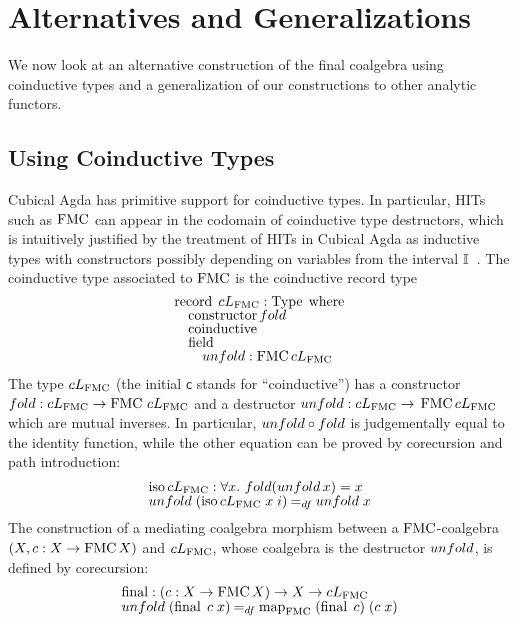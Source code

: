 \documentclass[a4paper,USenglish,cleveref]{lipics-v2021}
\begin{document}
\section{Alternatives and Generalizations}

We now look at an alternative construction of the final coalgebra using coinductive types and a generalization of our constructions to other analytic functors.

\subsection{Using Coinductive Types}\label{sec:coinductive}


Cubical Agda has primitive support for coinductive types. In particular, HITs such as $\M$ can appear in the codomain of coinductive type destructors, which is intuitively justified by the treatment of HITs in Cubical Agda as inductive types with constructors possibly depending on variables from the interval $\mathbb{I}$~\cite{Coquand2018,Cavallo2019}.
The coinductive type associated to $\M$ is the coinductive record type
\[
\def\arraystretch{0.8}
\begin{array}{l}
\Op{record} \; \cLim{\M} :  \Type \;\Op{where} \\
\quad  \Op{constructor} \fold \\
\quad  \Op{coinductive} \\
 \quad \Op{field} \\
 \quad \quad  \unfold : \M \cLim{\M}
\end{array}
\]
The type $\cLim{\M}$ (the initial $\mathsf{c}$ stands for \enquote{coinductive}) has a constructor $\fold : \cLim{\M}\to \M \,\cLim{\M}$ and a destructor 
$\unfold : \cLim{\M} \to \,\M \cLim{\M}$ which are mutual inverses. In particular, $\unfold \circ \fold$ is judgementally equal to the identity function, while the other equation can be proved by corecursion and path introduction:
\[
\def\arraystretch{0.8}
\begin{array}{l}
\Op{iso}\cLim{\M} : \forall x \Where \fold (\unfold \,x) = x \\
\unfold\; (\Op{iso}\cLim{\M}\; x\; i) \DefEq \unfold\; x
\end{array}
\]
The construction of a mediating coalgebra morphism between a
$\M$-coalgebra $(X , c : X \to \M X)$ and $\cLim{\M}$, whose coalgebra is the
destructor $\unfold$, is defined by corecursion:
\begin{equation*}
\begin{array}{l}
\Op{final} : (c : X \to \M X) \to X \to \cLim{\M} \\
\unfold \;(\Op{final} \;c \;x) \DefEq \Map{\M} \;(\Op{final}\; c)\; (c \;x)
\end{array}
\end{equation*}
\end{document}
